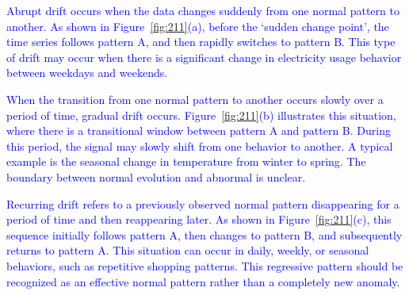 
\textcolor{blue}{Abrupt drift occurs when the data changes suddenly from one normal pattern to another. As shown in Figure~\ref{fig:211}(a), before the `sudden change point', the time series follows pattern A, and then rapidly switches to pattern B. This type of drift may occur when there is a significant change in electricity usage behavior between weekdays and weekends.}

\textcolor{blue}{When the transition from one normal pattern to another occurs slowly over a period of time, gradual drift occurs. Figure~\ref{fig:211}(b) illustrates this situation, where there is a transitional window between pattern A and pattern B. During this period, the signal may slowly shift from one behavior to another. A typical example is the seasonal change in temperature from winter to spring. The boundary between normal evolution and abnormal is unclear.}

\textcolor{blue}{Recurring drift refers to a previously observed normal pattern disappearing for a period of time and then reappearing later. As shown in Figure~\ref{fig:211}(c), this sequence initially follows pattern A, then changes to pattern B, and subsequently returns to pattern A. This situation can occur in daily, weekly, or seasonal behaviors, such as repetitive shopping patterns. This regressive pattern should be recognized as an effective normal pattern rather than a completely new anomaly.}



